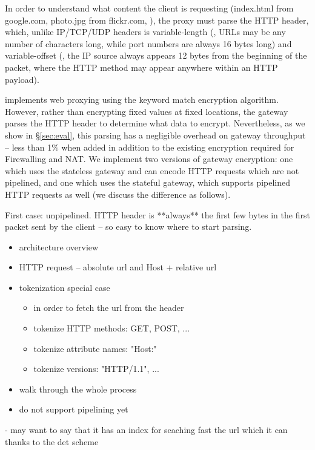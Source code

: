 In order to understand what content the client is requesting (index.html from google.com, photo.jpg from flickr.com, \etc{}), the proxy must parse the HTTP header, which, unlike IP/TCP/UDP headers is variable-length (\eg{}, URLs may be any number of characters long, while port numbers are always 16 bytes long) and variable-offset (\eg{}, the IP source always appears 12 bytes from the beginning of the packet, where the HTTP method may appear anywhere within an HTTP payload).

\sys implements web proxying using the keyword match encryption algorithm. 
However, rather than encrypting fixed values at fixed locations, the \sys gateway parses the HTTP header to determine what data to encrypt.
Nevertheless, as we show in \S\ref{sec:eval}, this parsing has a negligible overhead on gateway throughput -- less than 1\% when added in addition to the existing encryption required for Firewalling and NAT.
We implement two versions of gateway encryption: one which uses the stateless gateway and can encode HTTP requests which are not pipelined, and one which uses the stateful gateway, which supports pipelined HTTP requests as well (we discuss the difference as follows).

First case: unpipelined. HTTP header is **always** the first few bytes in the first packet sent by the client -- so easy to know where to start parsing.
\begin{itemize}
\item architecture overview
\item HTTP request -- absolute url and Host + relative url
\item tokenization special case \\
    \begin{itemize}
    \item in order to fetch the url from the header
    \item tokenize HTTP methods: GET, POST, ...
    \item tokenize attribute names: "Host:"
    \item tokenize versions: "HTTP/1.1", ...
    \end{itemize}
\item walk through the whole process
\item do not support pipelining yet
\end{itemize}

- may want to say that it has an index for seaching fast the url which it can thanks to the det scheme


